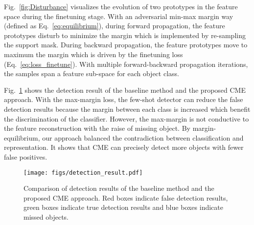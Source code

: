 \documentclass[final]{cvpr}
\begin{document}
Fig.\ \ref{fig:Disturbance} visualizes the evolution of two prototypes in the feature space during the finetuning stage. With an adversarial min-max margin way (defined as Eq.\ \ref{eq:equilibrium}), during forward propagation, the feature prototypes disturb to minimize the margin which is implemented by re-sampling the support mask. During backward propagation, the feature prototypes move to maximum the margin which is driven by the finetuning loss (Eq.\ \ref{eq:loss_finetune}). With multiple forward-backward propagation iterations, the samples span a feature sub-space for each object class.

Fig.\ \ref{fig:examples} shows the detection result of the baseline method and the proposed CME approach. With the max-margin loss, the few-shot detector can reduce the false detection results because the margin between each class is increased which benefit the discrimination of the classifier. However, the max-margin is not conductive to the feature reconstruction with the raise of missing object. By margin-equilibrium, our approach balanced the contradiction between classification and representation. It shows that CME can precisely detect more objects with fewer false positives.

\begin{comment}
{\color{red}
Fig.\ \ref{fig:D_inter} shows the statistics of the inter-class distance  and the difference of inter-class distance  and intra-class distance  between classes, . According to Eq.\ \ref{eq:bound},  is the upper bound of the margin  between -th class and -th class while  is the lower bound. With the max-margin loss, the inter-class distance increases which means that the upper bound of the margin increases. With the feature disturbance, the network is learned in an adversarial manner which decreases inter-class distance decreases towards class margin equilibrium.}
\end{comment}

\begin{comment}
\begin{figure}[t]
\centering
\texttt{[image: figs/D\_inter.pdf]}
\caption{Comparison of  and .}
\label{fig:D_inter}
\end{figure}
\end{comment}

\begin{figure}[t]
\centering
\texttt{[image: figs/detection\_result.pdf]}
\caption{Comparison of detection results of the baseline method and the proposed CME approach. Red boxes indicate false detection results, green  boxes indicate true detection results and blue boxes indicate missed objects.}
\label{fig:examples}
\end{figure}
    
\end{document}
